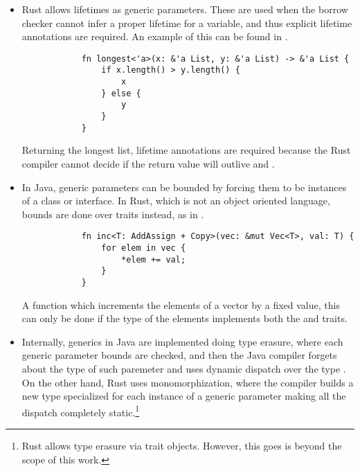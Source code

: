 \begin{itemize}
    \item Rust allows lifetimes as generic parameters. These are used when the
        borrow checker cannot infer a proper lifetime for a variable, and thus
        explicit lifetime annotations are required. An example of this can be
        found in .
  
        \begin{listing}[h]
            \begin{verbatim}
            fn longest<'a>(x: &'a List, y: &'a List) -> &'a List {
                if x.length() > y.length() {
                    x
                } else {
                    y
                }
            }
            \end{verbatim}
            \caption{Returning the longest list, lifetime annotations are required
            because the Rust compiler cannot decide if the return value will outlive
         and .}
          \label{lst:gen_lifetimes}
        \end{listing}
    
    \item In Java, generic parameters can be bounded by forcing them to be
        instances of a class or interface. In Rust, which is not an object
        oriented language, bounds are done over traits instead, as in
        .
  
        \begin{listing}[h]
            \begin{verbatim}
            fn inc<T: AddAssign + Copy>(vec: &mut Vec<T>, val: T) {
                for elem in vec {
                    *elem += val;
                }
            }
            \end{verbatim}
            \caption{A function which increments the elements of a vector by a fixed
                value, this can only be done if the type of the elements 
                implements both the  and  traits.}
          \label{lst:bounds}
        \end{listing}

    \item Internally, generics in Java are implemented doing type erasure, where
        each generic parameter bounds are checked, and then the Java compiler
        forgets about the type of such paremeter and uses dynamic dispatch over
        the type . On the other hand, Rust uses monomorphization,
        where the compiler builds a new type specialized for each instance of a
        generic parameter making all the dispatch completely
        static.\footnote{Rust allows type erasure via trait objects. However,
        this goes is beyond the scope of this work.}
\end{itemize}

